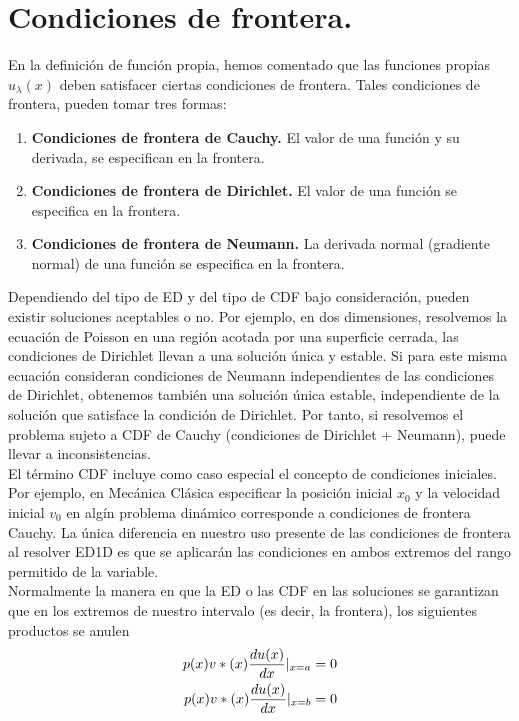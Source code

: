 \section{Condiciones de frontera.}
En la definición de función propia, hemos comentado que las funciones propias $u_{\lambda} (x)$ deben satisfacer ciertas condiciones de frontera. Tales condiciones de frontera, pueden tomar tres formas:
\begin{enumerate}
\item \textbf{Condiciones de frontera de Cauchy. } El valor de una función y su derivada, se especifican en la frontera. 
\item \textbf{Condiciones de frontera de Dirichlet. } El valor de una función se especifica en la frontera.
\item \textbf{Condiciones de frontera de Neumann. } La derivada normal (gradiente normal) de una función se especifica en la frontera.
\end{enumerate}
Dependiendo del tipo de ED y del tipo de CDF bajo consideración, pueden existir soluciones aceptables o no. Por ejemplo, en dos dimensiones, resolvemos la ecuación de Poisson en una región acotada por una superficie cerrada, las condiciones de Dirichlet llevan a una solución única y estable. Si para este misma ecuación consideran condiciones de Neumann independientes de las condiciones de Dirichlet, obtenemos también una solución única estable, independiente de la solución que satisface la condición de Dirichlet. Por tanto, si resolvemos el problema sujeto a CDF de Cauchy (condiciones de Dirichlet + Neumann), puede llevar a inconsistencias.
\\
El término CDF incluye como caso especial el concepto de condiciones iniciales. Por ejemplo, en Mecánica Clásica especificar la posición inicial $x_{0}$ y la velocidad inicial $v_{0}$ en algín problema dinámico corresponde a condiciones de frontera Cauchy. La única diferencia en nuestro uso presente de las condiciones de frontera al resolver ED1D es que se aplicarán las condiciones en ambos extremos del rango permitido de la variable.
\\
Normalmente la manera en que la ED o las CDF en las soluciones se garantizan que en los extremos de nuestro intervalo (es decir, la frontera), los siguientes productos se anulen
\begin{eqnarray}
\begin{aligned}
p(x) v*(x) \dfrac{d {u(x)}}{d x} \vert_{x=a} = 0 \\
p(x) v*(x) \dfrac{d {u(x)}}{d x} \vert_{x=b} = 0
\label{eq:ecuacion_20}
\end{aligned}
\end{eqnarray}
